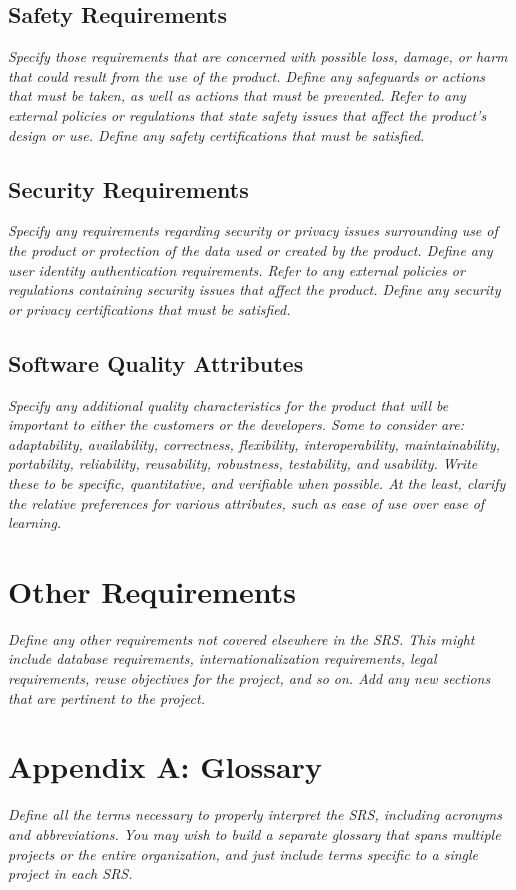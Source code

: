 \documentclass{article}
\begin{document}
\subsection{Safety Requirements}
\emph{Specify those requirements that are concerned with possible loss, damage, or harm that could result from the use of the product. Define any safeguards or actions that must be taken, as well as actions that must be prevented. Refer to any external policies or regulations that state safety issues that affect the product’s design or use. Define any safety certifications that must be satisfied.}
\subsection{Security Requirements}
\emph{Specify any requirements regarding security or privacy issues surrounding use of the product or protection of the data used or created by the product. Define any user identity authentication requirements. Refer to any external policies or regulations containing security issues that affect the product. Define any security or privacy certifications that must be satisfied.}
\subsection{Software Quality Attributes}
\emph{Specify any additional quality characteristics for the product that will be important to either the customers or the developers. Some to consider are: adaptability, availability, correctness, flexibility, interoperability, maintainability, portability, reliability, reusability, robustness, testability, and usability. Write these to be specific, quantitative, and verifiable when possible. At the least, clarify the relative preferences for various attributes, such as ease of use over ease of learning.}
\section{Other Requirements}
\emph{Define any other requirements not covered elsewhere in the SRS. This might include database requirements, internationalization requirements, legal requirements, reuse objectives for the project, and so on. Add any new sections that are pertinent to the project.}
\section{Appendix A: Glossary}
\emph{Define all the terms necessary to properly interpret the SRS, including acronyms and abbreviations. You may wish to build a separate glossary that spans multiple projects or the entire organization, and just include terms specific to a single project in each SRS.}
\end{document}
